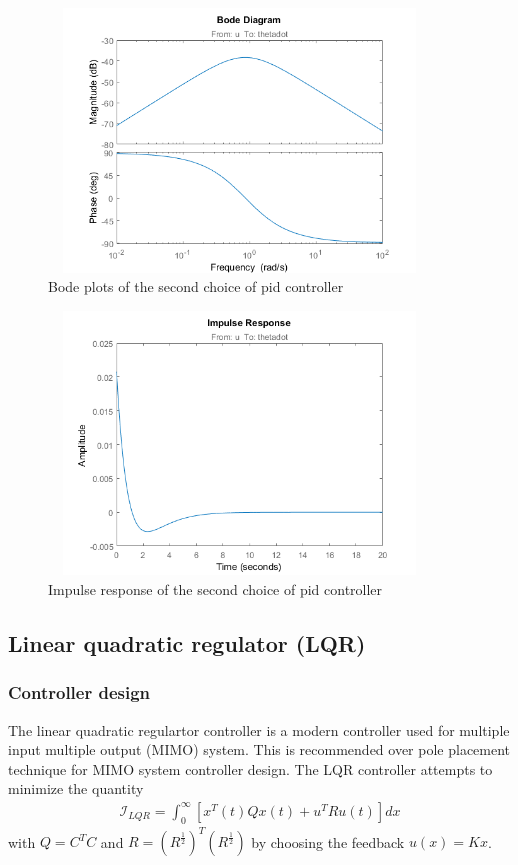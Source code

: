 \documentclass [12pt,letterpaper]{exam}
\begin{document}
\begin{figure}[H]
  \centering
    \includegraphics[width=10.15cm, height=7cm]{pid2_bode} 
  \caption{Bode plots of the second choice of pid controller}
  \label{fig:pid2_bode}
\end{figure}

\begin{figure}[H]
  \centering
    \includegraphics[width=10.15cm, height=7cm]{pid2_impulse} 
  \caption{Impulse response of the second choice of pid controller}
  \label{fig:pid2_impulse}
\end{figure}



\subsection{Linear quadratic regulator (LQR)}
\subsubsection{Controller design}
The linear quadratic regulartor controller is a modern controller used for multiple input multiple output (MIMO) system. This is recommended over pole placement technique for MIMO system controller design. The LQR controller attempts to minimize the quantity
\begin{align}
\mathcal{I}_{LQR} = \int_{0}^{\infty} [x^T(t)Qx(t) + u^TRu(t)] dx
\end{align}
with $Q = C^TC$ and $R = (R^{\frac{1}{2}})^T(R^{\frac{1}{2}})$ by choosing the feedback $u(x) = Kx$.
\end{document}
